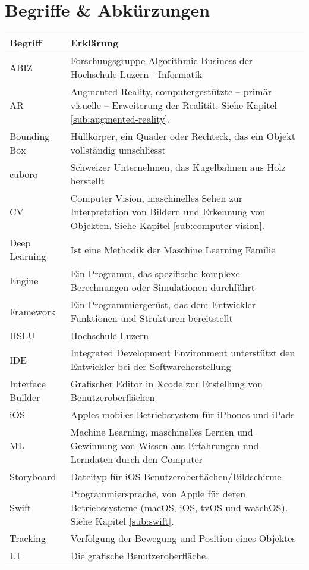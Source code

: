 \section*{Begriffe \& Abkürzungen}
\begin{table}
	\begin{tabular}{@{} p{} p{} @{}}
		\hline
		\textbf{Begriff} & \textbf{Erklärung} \\
		\hline
		ABIZ	& Forschungsgruppe Algorithmic Business der Hochschule Luzern - Informatik \\
		AR 		& Augmented Reality, computergestützte – primär visuelle – Erweiterung der Realität. Siehe Kapitel \ref{sub:augmented-reality}. \\
		Bounding Box & Hüllkörper, ein Quader oder Rechteck, das ein Objekt vollständig umschliesst \\
		cuboro	& Schweizer Unternehmen, das Kugelbahnen aus Holz herstellt \\
		CV		& Computer Vision, maschinelles Sehen zur Interpretation von Bildern und Erkennung von Objekten. Siehe Kapitel \ref{sub:computer-vision}. \\
		Deep Learning & Ist eine Methodik der Maschine Learning Familie \\
		Engine	& Ein Programm, das spezifische komplexe Berechnungen oder Simulationen durchführt \\
		Framework	& Ein Programmiergerüst, das dem Entwickler Funktionen und Strukturen bereitstellt \\
		HSLU	& Hochschule Luzern \\
		IDE 	& Integrated Development Environment unterstützt den Entwickler bei der Softwareherstellung \\
		Interface Builder & Grafischer Editor in Xcode zur Erstellung von Benutzeroberflächen \\
		iOS		& Apples mobiles Betriebssystem für iPhones und iPads \\
		ML		& Machine Learning, maschinelles Lernen und Gewinnung von Wissen aus Erfahrungen und Lerndaten durch den Computer \\
		Storyboard & Dateityp für iOS Benutzeroberflächen/Bildschirme \\
		Swift	& Programmiersprache, von Apple für deren Betriebssysteme (macOS, iOS, tvOS und watchOS). Siehe Kapitel \ref{sub:swift}. \\
		Tracking & Verfolgung der Bewegung und Position eines Objektes \\
		UI & Die grafische Benutzeroberfläche. \\

\end{tabular}
\end{table}
